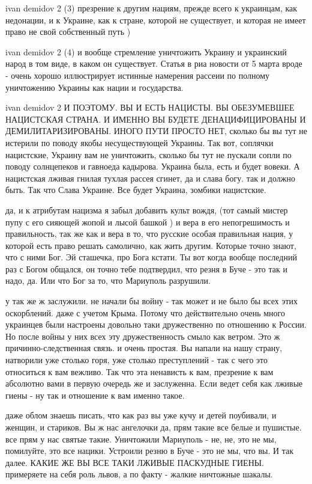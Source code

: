 ivan demidov 2
(3) презрение к другим нациям, прежде всего к украинцам, как недонации, и к
Украине, как к стране, которой не существует, и которая не имеет право не свой
собственный путь )

ivan demidov 2 (4) и вообще стремление уничтожить Украину и украинский народ в
том виде, в каком он существует. Статья в риа новости от 5 марта вроде - очень
хорошо иллюстрирует истинные намерения рассеии по полному уничтожению Украины
как нации и государства.

ivan demidov 2 И ПОЭТОМУ. ВЫ И ЕСТЬ НАЦИСТЫ. ВЫ ОБЕЗУМЕВШЕЕ НАЦИСТСКАЯ СТРАНА.
И ИМЕННО ВЫ БУДЕТЕ ДЕНАЦИФИЦИРОВАНЫ И ДЕМИЛИТАРИЗИРОВАНЫ. ИНОГО ПУТИ ПРОСТО
НЕТ, сколько бы вы тут не истерили по поводу якобы несуществующей Украины. Так
вот, соплячки нацистские, Украину вам не уничтожить, сколько бы тут не пускали
сопли по поводу солнцепеков и гавноеда кадырова. Украина была, есть и будет
вовеки. А нацистская лживая гнилая тухлая рассея сгинет, да и слава богу. так и
должно быть. Так что Слава Украине. Все будет Украина, зомбики нацистские.

да, и к атрибутам нацизма я забыл добавить культ вождя, (тот самый мистер пупу
с его сияющей жопой и лысой башкой ) и вера в его непогрешимость и
правильность, так же как и вера в то, что русские особая правильная нация, у
которой есть право решать самолично, как жить другим. Которые точно знают, что
с ними Бог. Эй сташечка, про Бога кстати. Ты вот когда вообще последний раз с
Богом общался, он точно тебе подтвердил, что резня в Буче - это так и надо, да.
Или что Бог за то, что Мариуполь разрушили.

у так же ж заслужили. не начали бы войну - так может и не было бы всех этих
оскорблений. даже с учетом Крыма. Потому что действительно очень много
украинцев были настроены довольно таки дружественно по отношению к России. Но
после войны у них всех эту дружественность смыло как ветром. Это ж
причинно-следственная связь. и очень простая. Вы напали на нашу страну,
натворили уже столько горя, уже столько преступлений - так с чего это
относиться к вам вежливо. Так что эта ненависть к вам, презрение к вам
абсолютно вами в первую очередь же и заслуженна. Если ведет себя как лживые
гиены - ну так и отношение к вам именно такое.

даже облом знаешь писать, что как раз вы уже кучу и детей поубивали, и женщин,
и стариков. Вы ж нас ангелочки да, прям такие все белые и пушистые. все прям у
нас святые такие. Уничтожили Мариуполь - не, не, это не мы, помилуйте, это все
нацики. Устроили резню в Буче - это не мы, что вы. И так далее. КАКИЕ ЖЕ ВЫ ВСЕ
ТАКИ ЛЖИВЫЕ ПАСКУДНЫЕ ГИЕНЫ. примеряете на себя роль львов, а по факту - жалкие
ничтожные шакалы.


